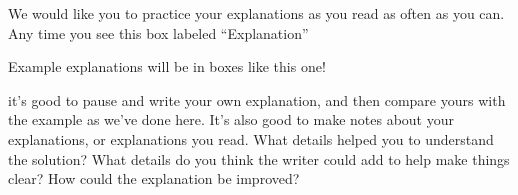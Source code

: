 \documentclass[noauthor,nooutcomes]{ximera}
\begin{document}
We would like you to practice your explanations as you read as often as you can. Any time you see this box labeled ``Explanation''
\begin{explanation}
	Example explanations will be in boxes like this one!
\end{explanation}
it's good to pause and write your own explanation, and then compare yours with the example as we've done here. It's also good to make notes about your explanations, or explanations you read. What details helped you to understand the solution? What details do you think the writer could add to help make things clear? How could the explanation be improved?
\end{document}
